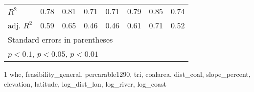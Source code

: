 \documentclass{article}
\begin{document}
\begin{table}[htbp]
\begin{threeparttable}
{\begin{tabular}{l*{7}{c}}
\(R^{2}\)   &        0.78         &        0.81         &        0.71         &        0.71         &        0.79         &        0.85         &        0.74         \\
adj. \(R^{2}\)&        0.59         &        0.65         &        0.46         &        0.46         &        0.61         &        0.71         &        0.52         \\
\hline\hline
\multicolumn{8}{l}{\footnotesize Standard errors in parentheses}\\
\multicolumn{8}{l}{\footnotesize \sym{*} \(p<0.1\), \sym{**} \(p<0.05\), \sym{***} \(p<0.01\)}\\
\end{tabular}}
\begin{tablenotes}
\item[1] whe, feasibility\_general, percarable1290, tri, coalarea, dist\_coal, slope\_percent, elevation, latitude, log\_dist\_lon, log\_river, log\_coast
\end{tablenotes}
\end{threeparttable}
\end{table}
\end{document}
